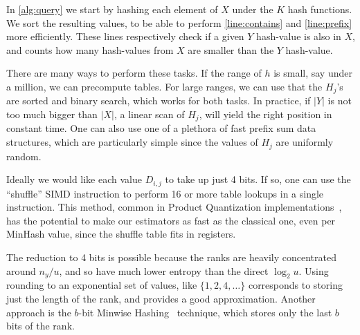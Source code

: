 In \cref{alg:query} we start by hashing each element of $X$ under the $K$ hash functions.
We sort the resulting values, to be able to perform \cref{line:contains} and \cref{line:prefix} more efficiently.
These lines respectively check if a given $Y$ hash-value is also in $X$, and counts how many hash-values from $X$ are smaller than the $Y$ hash-value.

There are many ways to perform these tasks.
If the range of $h$ is small, say under a million, we can precompute tables.
For large ranges, we can use that the $H_j$'s are sorted and binary search, which works for both tasks.
In practice, if $|Y|$ is not too much bigger than $|X|$, a linear scan of $H_j$, will yield the right position in constant time.
One can also use one of a plethora of fast prefix sum data structures, which are particularly simple since the values of $H_j$ are uniformly random.

Ideally we would like each value $D_{i,j}$ to take up just 4 bits.
If so, one can use the ``shuffle'' SIMD instruction to perform 16 or more table lookups in a single instruction.
This method, common in Product Quantization implementations~\cite{andre2019quicker}, has the potential to make our estimators as fast as the classical one, even per MinHash value, since the shuffle table fits in registers.

The reduction to 4 bits is possible because the ranks are heavily concentrated around $n_y/u$, and so have much lower entropy than the direct $\log_2 u$.
Using rounding to an exponential set of values, like $\{1, 2, 4, \dots\}$ corresponds to storing just the length of the rank, and provides a good approximation.
Another approach is the $b$-bit Minwise Hashing~\cite{li2010b} technique, which stores only the last $b$ bits of the rank.
